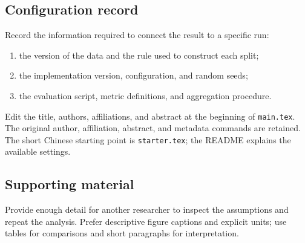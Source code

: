 \documentclass[10pt]{njulink}
\begin{document}
\subsection{Configuration record}
Record the information required to connect the result to a specific run:
\begin{enumerate}
  \item the version of the data and the rule used to construct each split;
  \item the implementation version, configuration, and random seeds;
  \item the evaluation script, metric definitions, and aggregation procedure.
\end{enumerate}

\begin{njubox}[title={Using this template}]
Edit the title, authors, affiliations, and abstract at the beginning of
\texttt{main.tex}. The original author, affiliation, abstract, and metadata
commands are retained. The short Chinese starting point is \texttt{starter.tex};
the README explains the available settings.
\end{njubox}

\subsection{Supporting material}
Provide enough detail for another researcher to inspect the assumptions and
repeat the analysis. Prefer descriptive figure captions and explicit units;
use tables for comparisons and short paragraphs for interpretation.
\end{document}
